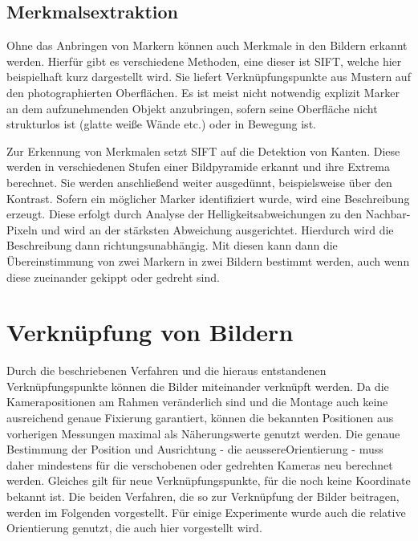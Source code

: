 \documentclass[./00PhotoBox.tex]{subfiles}
\begin{document}
\subsection{Merkmalsextraktion}
\label{ss:sift}
Ohne das Anbringen von Markern können auch Merkmale in den Bildern erkannt werden. Hierfür gibt es verschiedene Methoden, eine dieser ist \Gls{SIFT}, welche hier beispielhaft kurz dargestellt wird. Sie liefert Verknüpfungspunkte aus Mustern auf den photographierten Oberflächen. Es ist meist nicht notwendig explizit Marker an dem aufzunehmenden Objekt anzubringen, sofern seine Oberfläche nicht strukturlos ist (glatte weiße Wände etc.) oder in Bewegung ist.

Zur Erkennung von Merkmalen setzt \gls{SIFT} auf die Detektion von Kanten. Diese werden in verschiedenen Stufen einer Bildpyramide erkannt und ihre Extrema berechnet. Sie werden anschließend weiter ausgedünnt, beispielsweise über den Kontrast. Sofern ein möglicher Marker identifiziert wurde, wird eine Beschreibung erzeugt. Diese erfolgt  durch Analyse der Helligkeitsabweichungen zu den Nachbar-Pixeln und wird an der stärksten Abweichung ausgerichtet. Hierdurch wird die Beschreibung dann richtungsunabhängig. Mit diesen kann dann die Übereinstimmung von zwei Markern in zwei Bildern bestimmt werden, auch wenn diese zueinander gekippt oder gedreht sind.
\citep[S. 484f]{luhmann}

\section{Verknüpfung von Bildern}
\label{s:photogramm}
Durch die beschriebenen Verfahren und die hieraus entstandenen Verknüpfungs\-punkte können die Bilder miteinander verknüpft werden. Da die Kamerapositionen am Rahmen veränderlich sind und die Montage auch keine ausreichend genaue Fixierung garantiert, können die bekannten Positionen aus vorherigen Messungen maximal als Näherungswerte genutzt werden. Die genaue Bestimmung der Position und Ausrichtung - die \gls{aeussereOrientierung} - muss daher mindestens für die verschobenen oder gedrehten Kameras neu berechnet werden. Gleiches gilt für neue Verknüpfungspunkte, für die noch keine Koordinate bekannt ist. Die beiden Verfahren, die so zur Verknüpfung der Bilder beitragen, werden im Folgenden vorgestellt. Für einige Experimente wurde auch die relative Orientierung genutzt, die auch hier vorgestellt wird.
\end{document}
